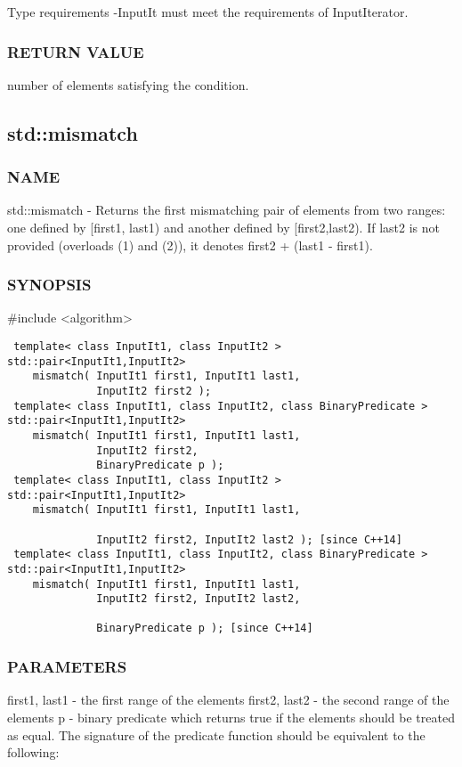  Type requirements
 -InputIt must meet the requirements of InputIterator.

\subsubsection{RETURN VALUE}
number of elements satisfying the condition.



\subsection{std::mismatch}

\subsubsection{NAME}
std::mismatch - Returns the first mismatching pair of elements from two ranges: one defined by [first1, last1) and another defined by [first2,last2). If last2 is not provided (overloads (1) and (2)), it denotes first2 + (last1 - first1).

\subsubsection{SYNOPSIS}
\#include <algorithm>

\begin{lstlisting}
 template< class InputIt1, class InputIt2 >
std::pair<InputIt1,InputIt2>
    mismatch( InputIt1 first1, InputIt1 last1,
              InputIt2 first2 );
 template< class InputIt1, class InputIt2, class BinaryPredicate >
std::pair<InputIt1,InputIt2>
    mismatch( InputIt1 first1, InputIt1 last1,
              InputIt2 first2,
              BinaryPredicate p );
 template< class InputIt1, class InputIt2 >
std::pair<InputIt1,InputIt2>
    mismatch( InputIt1 first1, InputIt1 last1,

              InputIt2 first2, InputIt2 last2 ); [since C++14]
 template< class InputIt1, class InputIt2, class BinaryPredicate >
std::pair<InputIt1,InputIt2>
    mismatch( InputIt1 first1, InputIt1 last1,
              InputIt2 first2, InputIt2 last2,

              BinaryPredicate p ); [since C++14]
\end{lstlisting}

\subsubsection{PARAMETERS}
first1, last1 - the first range of the elements
first2, last2 - the second range of the elements
p - binary predicate which returns true  if the elements should be treated as equal.
The signature of the predicate function should be equivalent to the following:

